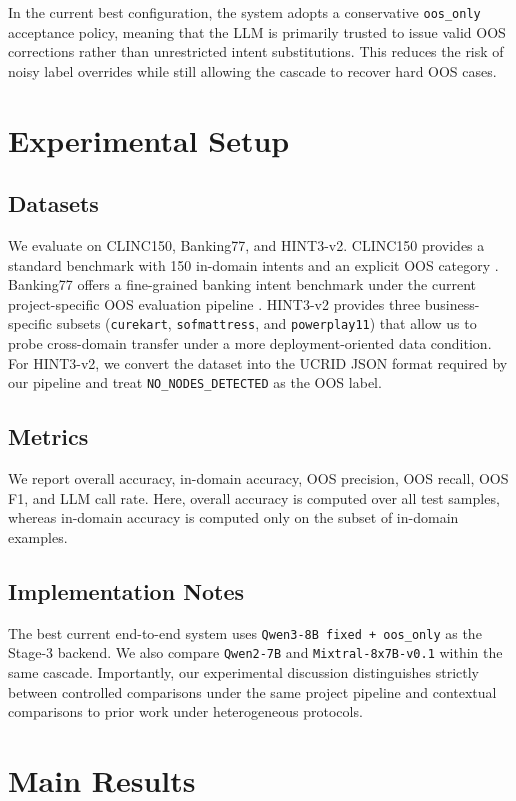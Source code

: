 \documentclass[11pt]{article}
\begin{document}
In the current best configuration, the system adopts a conservative \texttt{oos\_only} acceptance policy, meaning that the LLM is primarily trusted to issue valid OOS corrections rather than unrestricted intent substitutions. This reduces the risk of noisy label overrides while still allowing the cascade to recover hard OOS cases.

\section{Experimental Setup}
\subsection{Datasets}
We evaluate on CLINC150, Banking77, and HINT3-v2. CLINC150 provides a standard benchmark with 150 in-domain intents and an explicit OOS category \citep{larson2019clinc150}. Banking77 offers a fine-grained banking intent benchmark under the current project-specific OOS evaluation pipeline \citep{casanueva2020banking77}. HINT3-v2 provides three business-specific subsets (\texttt{curekart}, \texttt{sofmattress}, and \texttt{powerplay11}) that allow us to probe cross-domain transfer under a more deployment-oriented data condition. For HINT3-v2, we convert the dataset into the UCRID JSON format required by our pipeline and treat \texttt{NO\_NODES\_DETECTED} as the OOS label.

\subsection{Metrics}
We report overall accuracy, in-domain accuracy, OOS precision, OOS recall, OOS F1, and LLM call rate. Here, overall accuracy is computed over all test samples, whereas in-domain accuracy is computed only on the subset of in-domain examples.

\subsection{Implementation Notes}
The best current end-to-end system uses \texttt{Qwen3-8B fixed + oos\_only} as the Stage-3 backend. We also compare \texttt{Qwen2-7B} and \texttt{Mixtral-8x7B-v0.1} within the same cascade. Importantly, our experimental discussion distinguishes strictly between controlled comparisons under the same project pipeline and contextual comparisons to prior work under heterogeneous protocols.

\section{Main Results}
\end{document}
